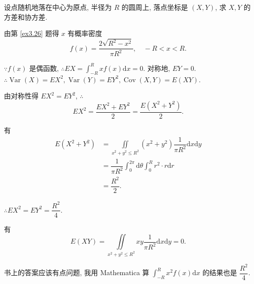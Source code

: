 \documentclass{ctexart}
\begin{document}
\begin{exercise}[以及 5.18]%
    设点随机地落在中心为原点, 半径为 $R$ 的圆周上, 落点坐标是 $(X,Y)$, 求 $X,Y$ 的方差和协方差.
\end{exercise}
\begin{solution}
    由第 \ref{ex3.26} 题得 $x$ 有概率密度
    \[f(x)=\dfrac{2\sqrt{R^2-x^2}}{\pi R^2},\quad-R<x<R.\]

    $\because f(x)$ 是偶函数, $\therefore EX=\int_{-R}^Rxf(x)\mathrm{d}x=0$. 对称地, $EY=0$. $\therefore\operatorname{Var}(X)=EX^2,\operatorname{Var}(Y)=EY^2,\operatorname{Cov}(X,Y)=E(XY)$.

    由对称性得 $EX^2=EY^2$, $\therefore$
    \[EX^2=\dfrac{EX^2+EY^2}{2}=\dfrac{E(X^2+Y^2)}{2}.\]

    有
    \begin{align*}
        E(X^2+Y^2) & =\iint\limits_{x^2+y^2\leq R^2}(x^2+y^2)\dfrac{1}{\pi R^2}\mathrm{d}x\mathrm{d}y \\
        & =\dfrac{1}{\pi R^2}\int_0^{2\pi}\mathrm{d}\theta\int_0^Rr^2\cdot r\mathrm{d}r \\
        & =\dfrac{R^2}{2}.
    \end{align*}

    $\therefore EX^2=EY^2=\dfrac{R^2}{4}$.

    有
    \[E(XY)=\iint\limits_{x^2+y^2\leq R^2}xy\dfrac{1}{\pi R^2}\mathrm{d}x\mathrm{d}y=0.\]
\end{solution}
\begin{note}
    书上的答案应该有点问题, 我用 Mathematica 算 $\int_{-R}^Rx^2f(x)\mathrm{d}x$ 的结果也是 $\dfrac{R^2}{4}$.
\end{note}
\end{document}
